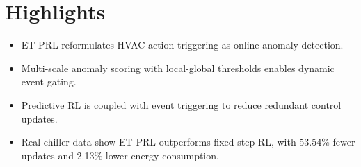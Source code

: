 \documentclass[12pt]{article}
\begin{document}
\section*{Highlights}

\begin{itemize}
\item ET-PRL reformulates HVAC action triggering as online anomaly detection.
\item Multi-scale anomaly scoring with local-global thresholds enables dynamic event gating.
\item Predictive RL is coupled with event triggering to reduce redundant control updates.
\item Real chiller data show ET-PRL outperforms fixed-step RL, with 53.54\% fewer updates and 2.13\% lower energy consumption.
\end{itemize}
\end{document}
